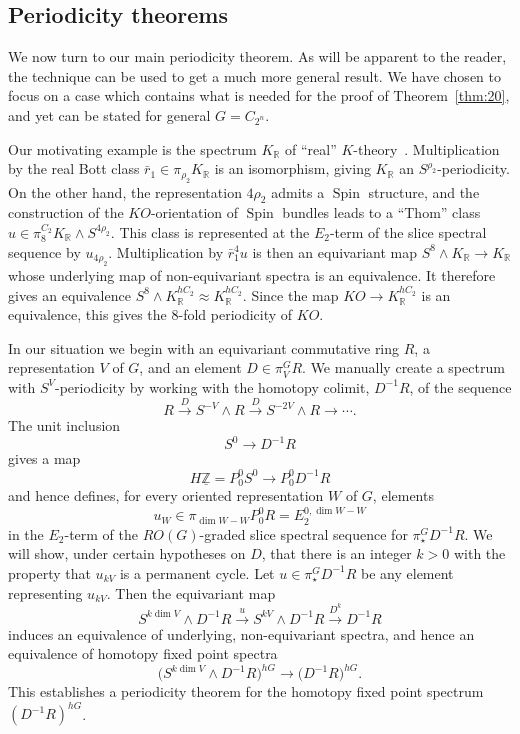 \documentclass{amsart}
\theoremstyle{definition}
\theoremstyle{remark}
\newcommand{\Z}{{\mathbb Z}}
\newcommand{\R}{{\mathbb R}}
\newcommand{\kr}{K_{\R}}
\newcommand{\ko}{KO}
\DeclareMathOperator{\spin}{Spin}
\newcommand{\slc}[2]{P_{#1}^{#1}#2}
\newcommand{\Zm}{\underline{\Z}}
\newcommand{\gbar}{\bar}
\newcommand{\rr}{\gbar{r}}
\newcommand{\zt}{C_{2}}
\newcommand{\ztn}{C_{2^{n}}}
\begin{document}
\subsection{Periodicity theorems}
\label{sec:periodicity-theorem-1}

We now turn to our main periodicity theorem.  As will be apparent to
the reader, the technique can be used to get a much more general
result.  We have chosen to focus on a case which contains what is
needed for the proof of Theorem~\ref{thm:20}, and yet can be stated
for general $G=\ztn$.

Our motivating example is the spectrum $\kr$ of ``real''
$K$-theory~\cite{atiyah66:_k}.  Multiplication by the real Bott class
$\rr_{1}\in\pi_{\rho_{2}}\kr$ is an isomorphism, giving $\kr$ an
$S^{\rho_{2}}$-periodicity.  On the other hand, the representation
$4\rho_{2}$ admits a $\spin$ structure, and the construction of the
$\ko$-orientation of $\spin$ bundles leads to a ``Thom'' class
$u\in\pi^{\zt}_{8}\kr\wedge S^{4\rho_{2}}$.  This class is represented
at the $E_{2}$-term of the slice spectral sequence by $u_{4\rho_{2}}$.
Multiplication by $\rr_{1}^{4} u$ is then an equivariant map
$S^{8}\wedge\kr\to\kr$ whose underlying map of non-equivariant spectra
is an equivalence.  It therefore gives an equivalence $S^{8}\wedge
\kr^{h\zt}\approx \kr^{h\zt}$.  Since the map $\ko\to \kr^{h \zt}$ is
an equivalence, this gives the $8$-fold periodicity of $\ko$.

In our situation we begin with an equivariant commutative ring $R$, a
representation $V$ of $G$, and an element $D\in\pi^{G}_{V}R$.  We
manually create a spectrum with $S^{V}$-periodicity by working with
the homotopy colimit, $D^{-1}R$, of the sequence
\[
R \xrightarrow{D}{} S^{-V}\wedge R \xrightarrow{D}{} S^{-2V}\wedge
R \to\cdots.
\]
The unit inclusion
\[
S^{0}\to D^{-1}R
\]
gives a map
\[
H\Zm=\slc{0}{S^{0}}\to \slc{0}{D^{-1}R}
\]
and hence defines, for every oriented representation $W$ of $G$,
elements
\[
u_{W}\in \pi_{\dim W-W}\slc{0}{R}=E_{2}^{0,\dim W-W}
\]
in the $E_{2}$-term of the $RO(G)$-graded slice spectral sequence for
$\pi^{G}_{\star}D^{-1}R$.   We will show, under certain hypotheses on
$D$, that there is an integer $k>0$ with the property that
$u_{kV}$ is a permanent cycle.   Let
$u\in\pi^{G}_{\star}D^{-1}R$  be any element representing
$u_{k V}$.   Then the equivariant map 
\[
S^{k \dim V} \wedge D^{-1}R\xrightarrow{u}{} S^{k V}\wedge 
D^{-1}R\xrightarrow{D^{k}}{} D^{-1}R
\]
induces an equivalence of underlying, non-equivariant spectra, and
hence an equivalence of homotopy fixed point spectra
\[
\big(S^{k\dim V}\wedge D^{-1}R\big)^{hG} \to 
\big(D^{-1}R\big)^{hG}. 
\]
This establishes a periodicity theorem for the homotopy fixed point
spectrum $(D^{-1}R)^{h G}$.
\end{document}
